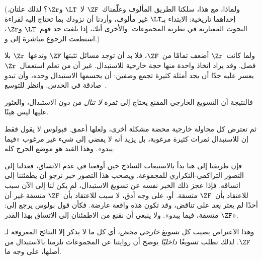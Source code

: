 \documentclass[../../../include/open-logic-section]{subfiles}
\begin{document}
(ولماذا، مع هذا، سلكنا الطريق المألوف وعلّمناك~$\ZF$ لا~$\LT$ و$\Zr$؟
لذلك علتان. إحداهما تاريخية: الابتداء بـ$\LT$ غير مألوف، وأردنا أن
نزودك بما تحتاج إليه لقراءة البحوث المعيارية في نظرية المجموعات.
والأخرى أنك، إذا بلغت حد فهم~$\LT$ و$\Zr$، استطعت الرجوع مباشرة إلى
\citealt{Potter2004} و\citealt{ButtonLT1}.)

ولما كانت~$\Zr$ أضعف تمامًا من~$\ZF$، فلا بد أن توجد مسائل تثبتها
$\ZF$ وتدعها~$\Zr$ بلا فصل. وقد يراد اتخاذ واحدة منها حجة خارجية
للاستبدال. غير أن من تعلم استعمال~$\Zr$ يعسر عليه جدًا أن يجد أمثلة
كثيرة تجمع وصفين: أن يحسمها الاستبدال وحده، وأن تبدو صادقة في الحدس.
وانظر للتوسع~\citealt[\S13.2]{Potter2004}.

فالنتيجة أن التسويغ الخارجي المقنع يحتاج إلى ثمرة \emph{لا تنال}
من دون الاستبدال، والعثور عليها ليس هينًا.

ثم تعترض كل محاولة خارجية محضة مشكلة أخرى، ولعلها أعمق. فبولوس لا
يقول فقط إن للاستبدال ثمرات كثيرة مرغوبة، بل يزيد أنه لا يفضي إلى
شيء غير مرغوب «فيما يبدو». وهذا القيد هو موضع الحرج كله.

فإن طريقنا إلى هنا بدأ بالاستيعاب الساذج حين أوقعنا في عدم الاتساق،
فعدلنا إلى التصور التراكمي-التكراري للمجموعة. ويصحب هذا التصور خبر
نرجو أن يطمئننا إلى اتساقه. فإذا عجز ذلك الخبر نفسه عن تسويغ
الاستبدال، لم يكن لنا إلى الآن سبب للاعتقاد بأن~$\ZF$ متسقة. أو، على
وجه أدق، لا سبب للاعتقاد بأن~$\ZF$ متسقة غير أن أحدًا لم يعثر
\emph{بعد} على تناقض، وقد تكون هذه واقعة عارضة. فكأن قول بولوس يرجع
إلى: «$\ZF$ متسقة، فيما يبدو». ولا ينبغي أن نقنع من الاطمئنان إلى
الاتساق بهذا القدر.

وهذا الاعتراض يصيب كل تسويغ \emph{خارجي محض}، أي كل ما لا يذكر
إلا النتائج المعروفة لـ$\ZF$. لذلك نطلب تسويغًا \emph{داخليًا}
يوضح أن روايتنا عن المجموعات تلزمنا بالاستبدال من أصلها، على وجه ما.
\end{document}
